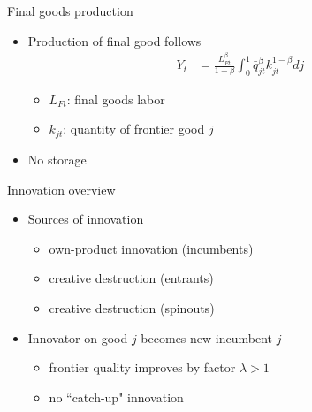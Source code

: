 \documentclass[english,usenames,dvipsnames]{beamer}
\begin{document}
\begin{frame}{Final goods production}\label{main:final_goods_production}
	\begin{itemize}
		\item Production of final good follows 
		\begin{align*}
		Y_t &= \frac{L_{Ft}^{\beta}}{1-\beta} \int_0^1 \bar{q}_{jt}^{\beta} k_{jt}^{1-\beta} dj 
		\end{align*}
	\hyperlink{definition:final_goods_production}{} 
		\begin{itemize}
			\item $L_{Ft}$: final goods labor
			\item $k_{jt}$: quantity of frontier good $j$
		\end{itemize} 
		\smallskip
		\item No storage
	\end{itemize}
\end{frame}

\begin{frame}{Innovation overview}
	\begin{itemize}
		\item Sources of innovation
		\begin{itemize}
			\item own-product innovation (incumbents)
			\item creative destruction (entrants)
			\item creative destruction (spinouts)
		\end{itemize}
		\medskip
		\item Innovator on good $j$ becomes new incumbent $j$
		\begin{itemize}
			\item frontier quality improves by factor $\lambda > 1$
			\item no ``catch-up" innovation
		\end{itemize}
	\end{itemize}
\end{frame}
\end{document}
